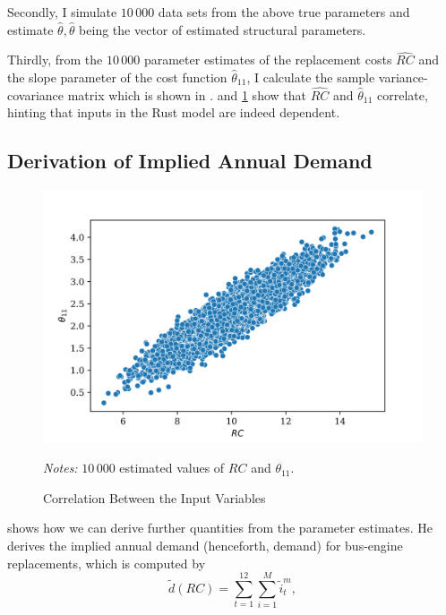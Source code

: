 Secondly, I simulate $10\,000$ data sets from the above true parameters and estimate $\hat{\theta}, \hat{\theta}$ being the vector of estimated structural parameters.

Thirdly, from the $10\,000$ parameter estimates of the replacement costs $\widehat{RC}$ and the slope parameter of the cost function ${\hat{\theta}}_{11}$, I calculate the sample variance-covariance matrix which is shown in .  and \cref{correlation} show that $\widehat{RC}$ and ${\hat{\theta}}_{11}$ correlate, hinting that inputs in the Rust model are indeed dependent.

\subsection{Derivation of Implied Annual Demand}

\begin{figure}[t]
	\caption{Correlation Between the Input Variables}
    \label{correlation}
	\centering
	\vspace*{-4mm}
	\begin{centering}
	\includegraphics[scale=0.9]{../figures/correlation_rc_theta.png}
	\end{centering}

	\small
	\textit{Notes:} $10\,000$ estimated values of $RC$ and $\theta_{11}$.

\end{figure}

\citet{R87} shows how we can derive further quantities from the parameter estimates. He derives the implied annual demand (henceforth, demand) for bus-engine replacements, which is computed by
\begin{equation*}
\tilde{d}(RC)=\sum_{t=1}^{12} \sum_{i=1}^{M} {\tilde{i}}_t^m,
\end{equation*}

